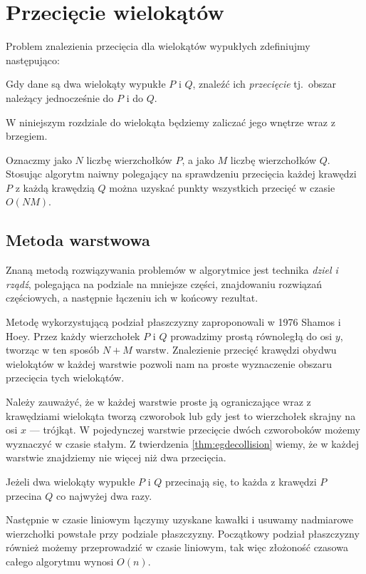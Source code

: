 \chapter{Przecięcie wielokątów}
Problem znalezienia przecięcia dla wielokątów wypukłych zdefiniujmy
następująco:

\begin{problem}
  Gdy dane są dwa wielokąty wypukłe $P$ i $Q$, znaleźć ich
  \emph{przecięcie} tj.\ obszar należący jednocześnie do $P$ i do $Q$.
\end{problem}

W niniejszym rozdziale do wielokąta będziemy zaliczać jego wnętrze
wraz z brzegiem.

Oznaczmy jako $N$ liczbę wierzchołków $P$, a jako $M$ liczbę
wierzchołków $Q$. Stosując algorytm naiwny polegający na sprawdzeniu
przecięcia każdej krawędzi $P$ z każdą krawędzią $Q$ można uzyskać
punkty wszystkich przecięć w czasie $O(NM)$.

\section{Metoda warstwowa}
Znaną metodą rozwiązywania problemów w algorytmice jest technika
\emph{dziel i rządź}, polegająca na podziale na mniejsze części,
znajdowaniu rozwiązań częściowych, a następnie łączeniu ich w końcowy
rezultat.

Metodę wykorzystującą podział płaszczyzny zaproponowali w 1976 Shamos
i Hoey. Przez każdy wierzchołek $P$ i $Q$ prowadzimy prostą równoległą
do osi $y$, tworząc w ten sposób $N+M$ warstw. Znalezienie przecięć
krawędzi obydwu wielokątów w każdej warstwie pozwoli nam na proste
wyznaczenie obszaru przecięcia tych wielokątów.

Należy zauważyć, że w każdej warstwie proste ją ograniczające wraz z
krawędziami wielokąta tworzą czworobok lub gdy jest to wierzchołek
skrajny na osi $x$ --- trójkąt. W pojedynczej warstwie przecięcie
dwóch czworoboków możemy wyznaczyć w czasie stałym. Z twierdzenia
\ref{thm:egdecollision} wiemy, że w każdej warstwie znajdziemy nie
więcej niż dwa przecięcia.

\begin{twierdzenie}
\label{thm:egdecollision}
  Jeżeli dwa wielokąty wypukłe $P$ i $Q$ przecinają się, to każda z
  krawędzi $P$ przecina $Q$ co najwyżej dwa razy.
\end{twierdzenie}

Następnie w czasie liniowym łączymy uzyskane kawałki i usuwamy
nadmiarowe wierzchołki powstałe przy podziale płaszczyzny. Początkowy
podział płaszczyzny również możemy przeprowadzić w czasie liniowym,
tak więc złożoność czasowa całego algorytmu wynosi $O(n)$.


